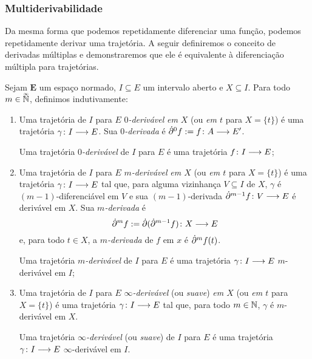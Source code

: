 \subsubsection{Multiderivabilidade}

Da mesma forma que podemos repetidamente diferenciar uma função, podemos repetidamente derivar uma trajetória. A seguir definiremos o conceito de derivadas múltiplas e demonstraremos que ele é equivalente à diferenciação múltipla para trajetórias.

\begin{definition}[Multiderivabilidade]
Sejam $\bm E$ um espaço normado, $I \subseteq E$ um intervalo aberto e $X \subseteq I$. Para todo $m \in \accentset{\infty}{\mathbb{N}}$, definimos indutivamente:
	\begin{enumerate}
	\item Uma trajetória de $I$ para $E$ \emph{$0$-derivável} \emph{em $X$} (ou \emph{em $t$} para $X = \{t\}$) é uma trajetória ${\gamma}\colon {I} \longrightarrow {E}$. Sua \emph{$0$-derivada} é $\dot{\partial}^0 f := {f}\colon {A} \longrightarrow {E'}$.

	Uma trajetória \emph{$0$-derivável} de $I$ para $E$ é uma trajetória ${f}\colon {I} \longrightarrow {E}$;

	\item Uma trajetória de $I$ para $E$ \emph{$m$-derivável} \emph{em $X$} (ou \emph{em $t$} para $X = \{t\}$) é uma trajetória ${\gamma}\colon {I} \longrightarrow {E}$ tal que, para alguma vizinhança $V \subseteq I$ de $X$, $\gamma$ é $(m-1)$-diferenciável em $V$ e sua $(m-1)$-derivada ${\dot{\partial}^{m-1} f}\colon {V} \longrightarrow {E}$ é derivável em $X$. Sua \emph{$m$-derivada} é
		\begin{equation*}
		\dot{\partial}^m f := {\dot{\partial} (\dot{\partial}^{m-1} f)}\colon {X} \longrightarrow {E}
		\end{equation*}
	e, para todo $t \in X$, a \emph{$m$-derivada} de $f$ em $x$ é $\dot{\partial}^m f(t)$.

	Uma trajetória \emph{$m$-derivável} de $I$ para $E$ é uma trajetória ${\gamma}\colon {I} \longrightarrow {E}$ $m$-derivável em $I$;

	\item Uma trajetória de $I$ para $E$ \emph{$\infty$-derivável} (ou \emph{suave}) \emph{em $X$} (ou \emph{em $t$} para $X = \{t\}$) é uma trajetória ${\gamma}\colon {I} \longrightarrow {E}$ tal que, para todo $m \in \mathbb{N}$, $\gamma$ é $m$-derivável em $X$.

	Uma trajetória \emph{$\infty$-derivável} (ou \emph{suave}) de $I$ para $E$ é uma trajetória ${\gamma}\colon {I} \longrightarrow {E}$ $\infty$-derivável em $I$.
	\end{enumerate}
\end{definition}

